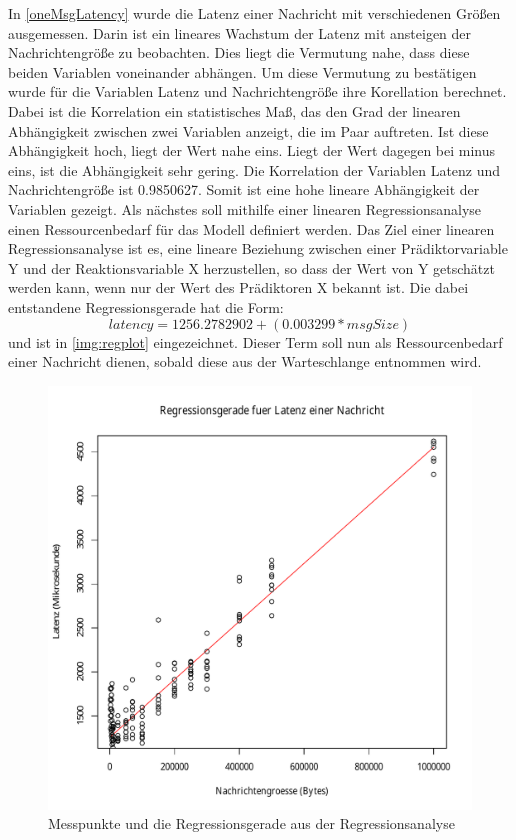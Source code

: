 In \autoref{oneMsgLatency} wurde die Latenz einer Nachricht mit verschiedenen Größen ausgemessen. Darin ist ein lineares Wachstum der Latenz mit ansteigen der Nachrichtengröße zu beobachten. Dies liegt die Vermutung nahe, dass diese beiden Variablen voneinander abhängen. Um diese Vermutung zu bestätigen wurde für die Variablen Latenz und Nachrichtengröße ihre Korellation berechnet. Dabei ist die Korrelation ein statistisches Maß, das den Grad der linearen Abhängigkeit zwischen zwei Variablen anzeigt, die im Paar auftreten. Ist diese Abhängigkeit hoch, liegt der Wert nahe eins. Liegt der Wert dagegen bei minus eins, ist die Abhängigkeit sehr gering. Die Korrelation der Variablen Latenz und Nachrichtengröße ist 0.9850627. Somit ist eine hohe lineare Abhängigkeit der Variablen gezeigt. Als nächstes soll mithilfe einer linearen Regressionsanalyse einen Ressourcenbedarf für das Modell definiert werden. Das Ziel einer linearen Regressionsanalyse ist es, eine lineare Beziehung zwischen einer Prädiktorvariable Y und der Reaktionsvariable X herzustellen, so dass der Wert von Y getschätzt werden kann, wenn nur der Wert des Prädiktoren X bekannt ist. Die dabei entstandene Regressionsgerade hat die Form: \[latency = 1256.2782902 + (0.003299 * msgSize)\] und ist in \autoref{img:regplot} eingezeichnet. Dieser Term soll nun als Ressourcenbedarf einer Nachricht dienen, sobald diese aus der Warteschlange entnommen wird. 
\begin{figure}
\center
  \includegraphics[width=1\textwidth]{images/modelling/oneMsgRegression.pdf}
  \caption{Messpunkte und die Regressionsgerade aus der Regressionsanalyse}
  \label{img:regplot}
\end{figure}

